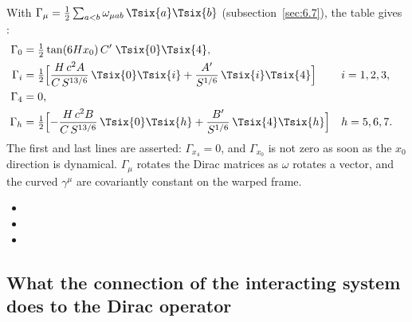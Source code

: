 With $\Gamma_\mu=\tfrac12\sum_{a<b}\omega_{\mu ab}\,\Tsix{a}\Tsix{b}$ (subsection~\ref{sec:6.7}), the table
gives \cfderived:
\begin{align*}
  \Gamma_0&=\tfrac12\tan(6Hx_0)\,C'\;\Tsix{0}\Tsix{4},\\
  \Gamma_i&=\tfrac12\Bigl[\frac{H\,c^2A}{C\,S^{13/6}}\,\Tsix{0}\Tsix{i}+\frac{A'}{S^{1/6}}\,\Tsix{i}\Tsix{4}\Bigr] &&i=1,2,3,\\
  \Gamma_4&=0,\\
  \Gamma_h&=\tfrac12\Bigl[-\frac{H\,c^2B}{C\,S^{13/6}}\,\Tsix{0}\Tsix{h}+\frac{B'}{S^{1/6}}\,\Tsix{4}\Tsix{h}\Bigr] &&h=5,6,7.
\end{align*}
The first and last lines are asserted: $\Gamma_{x_4}=0$, and $\Gamma_{x_0}$ is not zero as soon as the
$x_0$ direction is dynamical. $\Gamma_\mu$ rotates the Dirac matrices as $\omega$ rotates a vector, and the
curved $\gamma^\mu$ are covariantly constant on the warped frame. 
\begin{itemize}
  \item {}
  \item {}
  \item {}
\end{itemize}

\subsection{What the connection of the interacting system does to the Dirac operator}
\label{sec:6.17}

